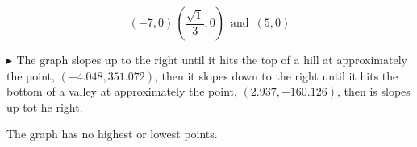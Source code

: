\documentclass{ximera}
\begin{document}
\begin{exercise}
\[
\left( -7, 0  \right) \,     \left( \frac{\sqrt{1}}{3}, 0  \right)  \, \text{ and } \,  (5, 0)
\]









\textbf{\textcolor{blue!55!black}{$\blacktriangleright$ }}  The graph slopes up to the right until it hits the top of a hill at approximately the point, $(-4.048, 351.072)$, then it slopes down to the right until it hits the bottom of a valley at approximately the point, $(2.937, -160.126)$, then is slopes up tot he right.



The graph has no highest or lowest points.






\end{exercise}
\end{document}
